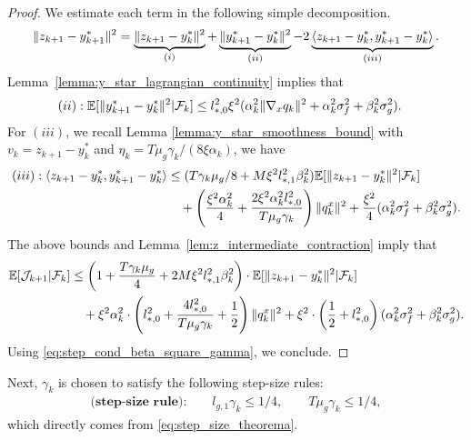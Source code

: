 \begin{proof}
We estimate each term in the following simple decomposition.
\begin{align*}
    \|z_{k+1} - y_{k+1}^*\|^2 = \underbrace{\|z_{k+1} - y_k^*\|^2}_{(i)} + \underbrace{\|y_{k+1}^* - y_k^*\|^2}_{(ii)} - 2 \underbrace{\langle z_{k+1}-y_{k}^*, y_{k+1}^*-y_k^* \rangle}_{(iii)}. 
\end{align*}
Lemma~\ref{lemma:y_star_lagrangian_continuity} implies that
\begin{align*}
    (ii): \mathbb{E}[\|y_{k+1}^* - y_k^*\|^2| \mathcal{F}_k] &\le l_{*,0}^2 \xi^2 (\alpha_k^2 \|\nabla_x q_k\|^2 + \alpha_k^2 \sigma_f^2 + \beta_k^2 \sigma_g^2).
\end{align*}
For $(iii)$, we recall Lemma \ref{lemma:y_star_smoothness_bound} with $v_k = z_{k+1} - y_k^*$ and $\eta_k = T \mu_g \gamma_k / (8 \xi \alpha_k)$, we have
\begin{align*}
    (iii): \langle z_{k+1} - y_k^*, y_{k+1}^* - y_k^* \rangle &\le ( T \gamma_k \mu_g / 8 + M \xi^2 l_{*,1}^2 \beta_k^2) \mathbb{E}[\|z_{k+1}-y_k^*\|^2 | \mathcal{F}_k] \\
    &\quad + \left( \frac{\xi^2 \alpha_k^2}{4} + \frac{2 \xi^2 \alpha_k^2 l_{*,0}^2}{T \mu_g \gamma_k} \right) \|q_k^x\|^2 + \frac{\xi^2}{4} (\alpha_k^2 \sigma_f^2 + \beta_k^2 \sigma_g^2).
\end{align*}
The above bounds and Lemma~\ref{lem:z_intermediate_contraction}
imply that
\begin{align}
    \mathbb{E}[\mathcal{J}_{k+1}|\mathcal{F}_k] &\le \left(1 + \frac{T\gamma_k\mu_g}{4} + 2 M \xi^2 l_{*,1}^2 \beta_k^2\right) \cdot \mathbb{E}[\|z_{k+1}-y_{k}^*\|^2|\mathcal{F}_k] \nonumber \\
    &\quad + \xi^2 \alpha_k^2 \cdot \left( l_{*,0}^2 + \frac{4 l_{*,0}^2}{T \mu_g \gamma_k} + \frac{1}{2} \right) \|q_k^x\|^2+ \xi^2 \cdot \left(\frac{1}{2} + l_{*,0}^2 \right) (\alpha_k^2 \sigma_f^2 + \beta_k^2 \sigma_g^2).
\end{align}
Using \eqref{eq:step_cond_beta_square_gamma}, we conclude.
\end{proof}


Next, $\gamma_k$ is chosen to satisfy the following step-size rules:
\begin{align}
    \textbf{(step-size rule):} \qquad l_{g,1} \gamma_k \le 1/4, \qquad T \mu_g \gamma_k \le 1/4, \label{eq:step_cond_gamma_standard}
\end{align}
which directly comes from \eqref{eq:step_size_theorema}. 

